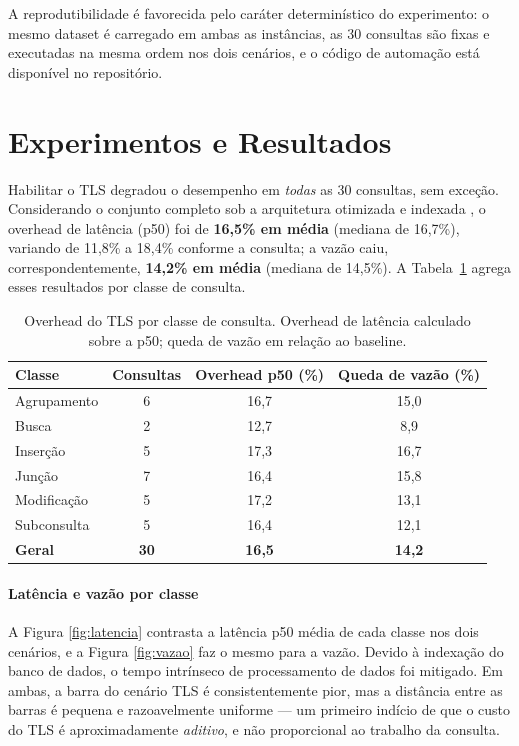 \documentclass[12pt]{article}
\begin{document}
A reprodutibilidade é favorecida pelo caráter determinístico do experimento: o
mesmo dataset é carregado em ambas as instâncias, as 30 consultas são fixas e
executadas na mesma ordem nos dois cenários, e o código de automação está
disponível no repositório.


\section{Experimentos e Resultados}
\label{sec:resultados}

Habilitar o TLS degradou o desempenho em \emph{todas} as 30 consultas, sem
exceção. Considerando o conjunto completo sob a arquitetura otimizada e indexada , o overhead de latência (p50) foi de
\textbf{16,5\% em média} (mediana de 16,7\%), variando de 11,8\% a 18,4\% conforme
a consulta; a vazão caiu, correspondentemente, \textbf{14,2\% em média} (mediana
de 14,5\%). A Tabela~\ref{tab:resumo} agrega esses resultados por classe de
consulta.

\begin{table}[ht]
\centering
\caption{Overhead do TLS por classe de consulta. Overhead de latência calculado sobre a p50; queda de vazão em relação ao baseline.}
\label{tab:resumo}
\begin{tabular}{@{}lccc@{}}
\toprule
\textbf{Classe} & \textbf{Consultas} & \textbf{Overhead p50 (\%)} & \textbf{Queda de vazão (\%)} \\
\midrule
Agrupamento & 6 & 16,7 & 15,0 \\
Busca       & 2 & 12,7 & \phantom{0}8,9 \\
Inserção    & 5 & 17,3 & 16,7 \\
Junção      & 7 & 16,4 & 15,8 \\
Modificação & 5 & 17,2 & 13,1 \\
Subconsulta & 5 & 16,4 & 12,1 \\
\midrule
\textbf{Geral} & \textbf{30} & \textbf{16,5} & \textbf{14,2} \\
\bottomrule
\end{tabular}
\end{table}

\paragraph{Latência e vazão por classe} 
A Figura \ref{fig:latencia} contrasta a latência p50 média de cada classe nos dois cenários, e a Figura \ref{fig:vazao} faz o mesmo para a vazão. Devido à indexação do banco de dados, o tempo intrínseco de processamento de dados foi mitigado.  
Em ambas, a barra do cenário TLS é consistentemente
pior, mas a distância entre as barras é pequena e razoavelmente uniforme --- um
primeiro indício de que o custo do TLS é aproximadamente \emph{aditivo}, e não
proporcional ao trabalho da consulta.
\end{document}
